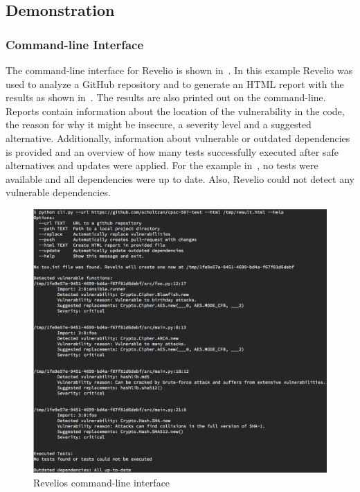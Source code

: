 \subsection{Demonstration}

\subsubsection{Command-line Interface}

The command-line interface for Revelio is shown in~. In this example Revelio was used to analyze a GitHub repository and to generate an HTML report with the results as shown in~. The results are also printed out on the command-line. Reports contain information about the location of the vulnerability in the code, the reason for why it might be insecure, a severity level and a suggested alternative. Additionally, information about vulnerable or outdated dependencies is provided and an overview of how many tests successfully executed after safe alternatives and updates were applied. For the example in~, no tests were available and all dependencies were up to date. Also, Revelio could not detect any vulnerable dependencies.


\begin{figure}[h]
\centering
\includegraphics[width=\linewidth]{"figures/command-line"}
\caption{Revelios command-line interface}
\label{fig:command-line}
\end{figure}

